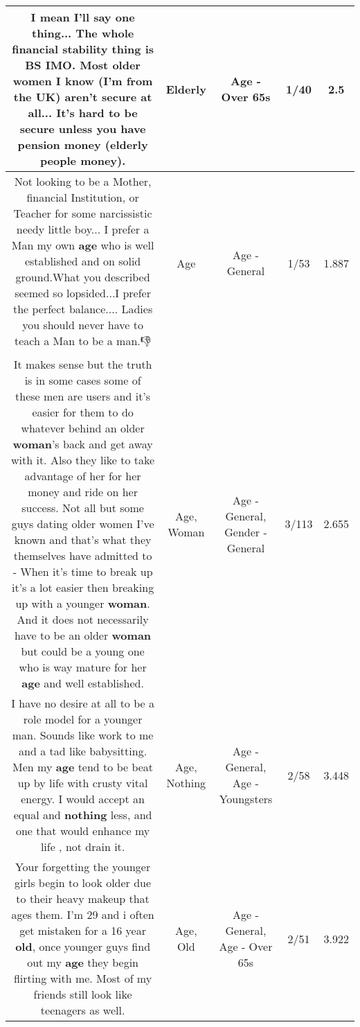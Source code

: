 \documentclass[11pt]{article}
\newlength\mylength
\begin{document}
\begin{center}
\begin{longtable}{|C{.65\mylength}|C{.30\mylength}|C{.12\mylength}|C{.12\mylength}|C{.12\mylength}|}
  \small I mean I'll say one thing... The whole financial stability thing is BS IMO. Most older women I know (I'm from the UK) aren't secure at all... It's hard to be secure unless you have pension money (\textbf{elderly} people money).\normalsize   & Elderly & Age - Over 65s & 1/40 & 2.5 \\  \hline
  \small Not looking to be a Mother, financial Institution, or Teacher for some narcissistic needy little boy... I prefer a Man my own \textbf{age} who is well established and on solid ground.What you described seemed so lopsided...I prefer the perfect balance.... Ladies you should never have to teach a Man to be a man.👎\normalsize   & Age & Age - General & 1/53 & 1.887 \\  \hline
  \small It makes sense but the truth is in some cases some of these men are users and it's easier for them to do whatever behind an older \textbf{woman}'s back and get away with it. Also they like to take advantage of her for her money and ride on her success. Not all but some guys dating older women I've known and that's what they themselves have admitted to - When it's time to break up it's a lot easier then breaking up with a younger \textbf{woman}. And it does not necessarily have to be an older \textbf{woman} but could be a young one who is way mature for her \textbf{age} and well established.\normalsize   & Age, Woman & Age - General, Gender - General & 3/113 & 2.655 \\  \hline
  \small I have no desire at all to be a role model for a younger man. Sounds like work to me and a tad like babysitting. Men my \textbf{age} tend to be beat up by life with crusty vital energy. I would accept an equal and \textbf{nothing} less, and one that would enhance my life , not drain it.\normalsize   & Age, Nothing & Age - General, Age - Youngsters & 2/58 & 3.448 \\  \hline
  \small Your forgetting the younger girls begin to look older due to their heavy makeup that ages them. I'm 29 and i often get mistaken for a 16 year \textbf{old}, once younger guys find out my \textbf{age} they begin flirting with me. Most of my friends still look like teenagers as well.\normalsize   & Age, Old & Age - General, Age - Over 65s & 2/51 & 3.922 \\  \hline

\end{longtable}
\end{center}
\end{document}
